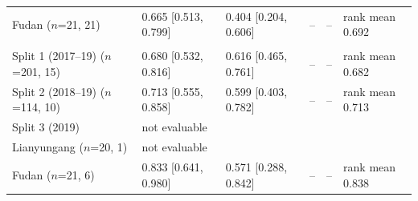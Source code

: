 \documentclass[pdflatex,sn-nature]{sn-jnl}
\begin{document}
\begin{appendices}
\begin{table}
\begin{tabular}{@{}lllll>{\raggedright\arraybackslash}p{4.7cm}@{}}
\quad Fudan ($n$=21, 21) & 0.665 [0.513, 0.799] & 0.404 [0.204, 0.606] & -- & -- & rank mean 0.692 \\
\addlinespace[2pt]
\multicolumn{6}{@{}l}{\textit{OS ($\mathcal{F}_6$)}} \\
\quad Split 1 (2017--19) ($n$=201, 15) & 0.680 [0.532, 0.816] & 0.616 [0.465, 0.761] & -- & -- & rank mean 0.682 \\
\quad Split 2 (2018--19) ($n$=114, 10) & 0.713 [0.555, 0.858] & 0.599 [0.403, 0.782] & -- & -- & rank mean 0.713 \\
\quad Split 3 (2019) & \multicolumn{5}{l}{not evaluable} \\
\quad Lianyungang ($n$=20, 1) & \multicolumn{5}{l}{not evaluable} \\
\quad Fudan ($n$=21, 6) & 0.833 [0.641, 0.980] & 0.571 [0.288, 0.842] & -- & -- & rank mean 0.838 \\
\bottomrule
\end{tabular}
\end{table}


\end{appendices}
\end{document}
